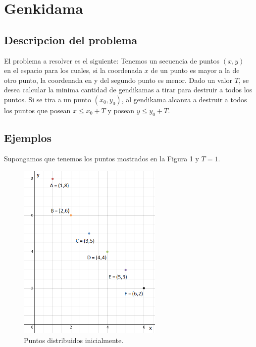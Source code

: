 \documentclass[10pt,a4paper]{article}
\begin{document}

\section{Genkidama}

\subsection{Descripcion del problema}

El problema a resolver es el siguiente:
Tenemos un secuencia de puntos $(x,y)$ en el espacio para los cuales, si la coordenada $x$ de un punto es mayor a la de otro punto, la coordenada en y del segundo punto es menor. Dado un valor $T$, se desea calcular la minima cantidad de gendikamas a tirar para destruir a todos los puntos. Si se tira a un punto $(x_{0},y_{0})$, al gendikama alcanza a destruir a todos los puntos que posean $x \leq x_{0} + T$ y posean $y \leq y_{0} + T$.\\

\subsection{Ejemplos}

Supongamos que tenemos los puntos mostrados en la Figura 1 y $T = 1$.\\
\begin{figure}[t]
  \centering
  \includegraphics[width=7cm]{EjemploInicialUtil}
  \caption{Puntos distribuidos inicialmente.}
\end{figure}
\end{document}
